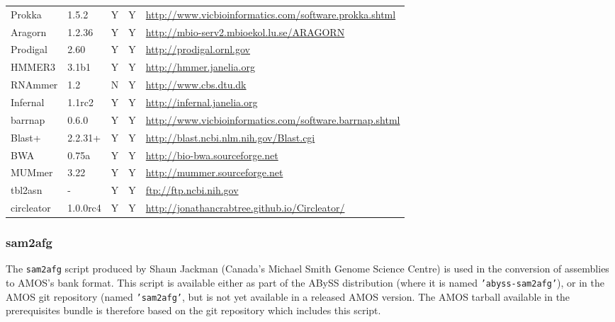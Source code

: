 \documentclass[a4paper,10pt]{article}
\begin{document}
\begin{table}[htb]
{\begin{tabular}{llccl}
Prokka     & 1.5.2   & Y & Y & \href{http://www.vicbioinformatics.com/software.prokka.shtml}{http://www.vicbioinformatics.com/software.prokka.shtml} \\
Aragorn    & 1.2.36  & Y & Y & \href{http://mbio-serv2.mbioekol.lu.se/ARAGORN/}{http://mbio-serv2.mbioekol.lu.se/ARAGORN} \\
Prodigal   & 2.60    & Y & Y & \href{http://prodigal.ornl.gov}{http://prodigal.ornl.gov} \\
HMMER3     & 3.1b1   & Y & Y & \href{http://hmmer.janelia.org}{http://hmmer.janelia.org} \\
RNAmmer    & 1.2     & N & Y & \href{http://www.cbs.dtu.dk/cgi-bin/sw_request?rnammer}{http://www.cbs.dtu.dk} \\
Infernal   & 1.1rc2  & Y & Y & \href{http://infernal.janelia.org}{http://infernal.janelia.org} \\
barrnap    & 0.6.0   & Y & Y & \href{http://www.vicbioinformatics.com/software.barrnap.shtml}{http://www.vicbioinformatics.com/software.barrnap.shtml} \\
Blast+     & 2.2.31+ & Y & Y & \href{http://blast.ncbi.nlm.nih.gov/Blast.cgi?CMD=Web\&PAGE_TYPE=BlastDocs\&DOC_TYPE=Download}{http://blast.ncbi.nlm.nih.gov/Blast.cgi} \\
BWA        & 0.75a   & Y & Y & \href{http://bio-bwa.sourceforge.net}{http://bio-bwa.sourceforge.net} \\
MUMmer     & 3.22    & Y & Y & \href{http://mummer.sourceforge.net/}{http://mummer.sourceforge.net} \\
tbl2asn    & -       & Y & Y & \href{ftp://ftp.ncbi.nih.gov/toolbox/ncbi\_tools/converters/by\_program/tbl2asn/}{ftp://ftp.ncbi.nih.gov} \\
circleator & 1.0.0rc4 & Y & Y & \href{http://jonathancrabtree.github.io/Circleator/}{http://jonathancrabtree.github.io/Circleator/} \\
\hline
\end{tabular}}
\label{tab:prereq}
\end{table}

\subsubsection{sam2afg}

The {\tt sam2afg} script produced by Shaun Jackman (Canada's Michael Smith
Genome Science Centre) is used in the conversion of assemblies to AMOS's bank
format. This script is available either as part of the ABySS distribution
(where it is named {\tt 'abyss-sam2afg'}), or in the AMOS git repository (named
{\tt 'sam2afg'}, but is not yet available in a released AMOS version. The AMOS
tarball available in the prerequisites bundle is therefore based on the git
repository which includes this script. 
\end{document}
